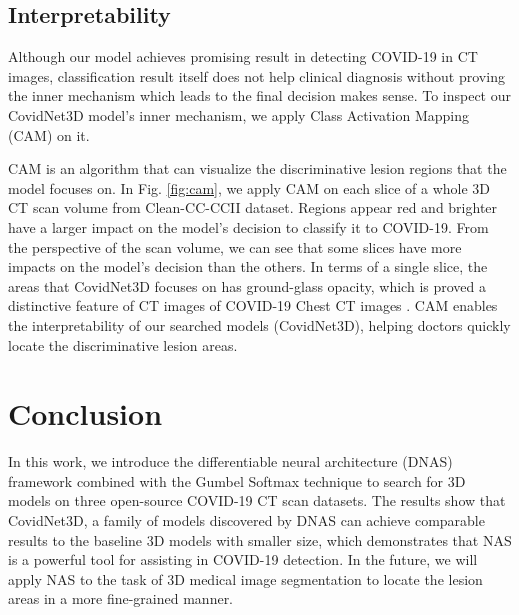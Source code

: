 \documentclass[letterpaper]{article}
\begin{document}
\subsection{Interpretability}
Although our model achieves promising result in detecting COVID-19 in CT images, classification result itself does not help clinical diagnosis without proving the inner mechanism which leads to the final decision makes sense. To inspect our CovidNet3D model's inner mechanism, we apply Class Activation Mapping (CAM) \cite{cam} on it.

CAM is an algorithm that can visualize the discriminative lesion regions that the model focuses on. In Fig. \ref{fig:cam}, we apply CAM on each slice of a whole 3D CT scan volume from Clean-CC-CCII dataset. Regions appear red and brighter have a larger impact on the model's decision to classify it to COVID-19. From the perspective of the scan volume, we can see that some slices have more impacts on the model's decision than the others. In terms of a single slice, the areas that CovidNet3D focuses on has ground-glass opacity, which is proved a distinctive feature of CT images of COVID-19 Chest CT images \cite{radio-chestCT}. CAM enables the interpretability of our searched models (CovidNet3D), helping doctors quickly locate the discriminative lesion areas.








%






\section{Conclusion}

In this work, we introduce the differentiable neural architecture (DNAS) framework combined with the Gumbel Softmax technique to search for 3D models on three open-source COVID-19 CT scan datasets. The results show that CovidNet3D, a family of models discovered by DNAS can achieve comparable results to the baseline 3D models with smaller size, which demonstrates that NAS is a powerful tool for assisting in COVID-19 detection. In the future, we will apply NAS to the task of 3D medical image segmentation to locate the lesion areas in a more fine-grained manner.
\end{document}
